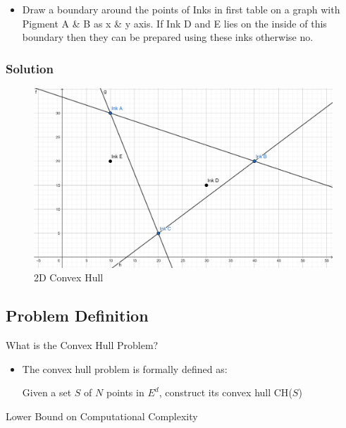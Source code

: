 \documentclass{beamer}
\begin{document}
\begin{frame}
    \begin{itemize}
        \item Draw a boundary around the points of Inks in first table on a graph with Pigment A \& B as x \& y axis. If Ink D and E lies on the inside of this boundary then they can be prepared using these inks otherwise no.\\
    \end{itemize}
    \frametitle{Solution}
      \begin{center}
     \begin{figure}[H]
        \caption{2D Convex Hull}
        \centering
        \includegraphics[scale=0.1]{presentation/convex_hull_intro.png}
        \end{figure}
    \end{center}
\end{frame}

\subsection{Problem Definition}
\begin{frame}{What is the Convex Hull Problem?}
    \begin{itemize}
        \item The convex hull problem is formally defined as:
        \begin{center}
            Given a set $S$ of $N$ points in $E^d$, construct its convex hull \textsc{CH}($S$)
        \end{center}
    \end{itemize}    
\end{frame}

\begin{frame}{Lower Bound on Computational Complexity}
    
\end{frame}
\end{document}
